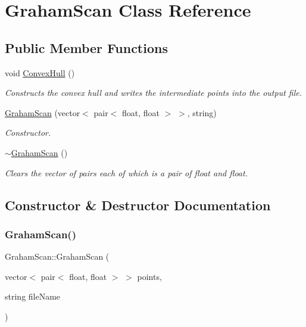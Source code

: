 \hypertarget{classGrahamScan}{}\section{Graham\+Scan Class Reference}
\label{classGrahamScan}
\subsection*{Public Member Functions}
\begin{DoxyCompactItemize}
\item 
\mbox{\label{classGrahamScan_afb777637ac86b9777276149f75bf071d}} 
void \hyperlink{classGrahamScan_afb777637ac86b9777276149f75bf071d}{Convex\+Hull} ()
\begin{DoxyCompactList}\small\item\em Constructs the convex hull and writes the intermediate points into the output file. \end{DoxyCompactList}\item 
\hyperlink{classGrahamScan_a7284059638b3e8f1db7a29bea3f06c99}{Graham\+Scan} (vector$<$ pair$<$ float, float $>$ $>$, string)
\begin{DoxyCompactList}\small\item\em Constructor. \end{DoxyCompactList}\item 
\mbox{\label{classGrahamScan_aff7859418231617f4b9dc19b8011a2c4}} 
\hyperlink{classGrahamScan_aff7859418231617f4b9dc19b8011a2c4}{$\sim$\+Graham\+Scan} ()
\begin{DoxyCompactList}\small\item\em Clears the vector of pairs each of which is a pair of float and float. \end{DoxyCompactList}\end{DoxyCompactItemize}


\subsection{Constructor \& Destructor Documentation}
\mbox{\label{classGrahamScan_a7284059638b3e8f1db7a29bea3f06c99}} 
\subsubsection{\texorpdfstring{Graham\+Scan()}{GrahamScan()}}
{\footnotesize\ttfamily Graham\+Scan\+::\+Graham\+Scan (\begin{DoxyParamCaption}\item[{vector$<$ pair$<$ float, float $>$ $>$}]{points,  }\item[{string}]{file\+Name }\end{DoxyParamCaption})}



